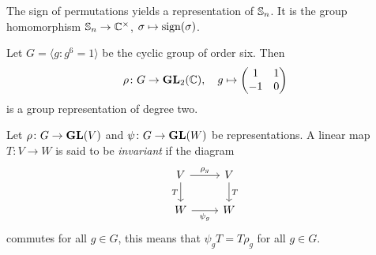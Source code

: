 \begin{example}
	The sign of permutations yields a representation of $\mathbb{S}_n$. It is the group homomorphism
	$\mathbb{S}_n\to\mathbb{C}^\times$, $\sigma\mapsto\operatorname{sign}(\sigma)$.  	
\end{example}

\begin{example}
	Let $G=\langle g:g^6=1\rangle$ be the cyclic group of order six. Then
	\[
	\rho\colon G\to\mathbf{GL}_2(\mathbb{C}),
	\quad 
	g\mapsto\begin{pmatrix}1&1\\-1&0\end{pmatrix}
	\] 
	is a group representation of degree two. 
\end{example}

%
%
%
%
\begin{definition}
    Let $\rho\colon G\to\mathbf{GL}(V)$ and $\psi\colon G\to\mathbf{GL}(W)$ be
    representations. A linear map $T\colon V\to W$ is said to be \emph{invariant} 
    if the diagram
    \[\begin{tikzcd}
	V & V \\
	W & W
	\arrow["{\rho_g}", from=1-1, to=1-2]
	\arrow["T"', from=1-1, to=2-1]
	\arrow["{\psi_g}"', from=2-1, to=2-2]
	\arrow["T", from=1-2, to=2-2]
\end{tikzcd}
\]
    commutes for all $g\in G$, this means that 
    $\psi_gT=T\rho_g$ for all $g\in G$.
\end{definition}

